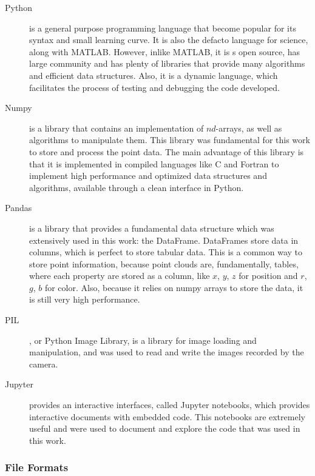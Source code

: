\begin{description}
    \item[Python] is a general purpose programming language that become popular for its syntax and small learning curve. It is also the defacto language for science, along with MATLAB. However, inlike MATLAB, it is s open source, has large community and has plenty of libraries that provide many algorithms and efficient data structures. Also, it is a dynamic language, which facilitates the process of testing and debugging the code developed.

    \item[Numpy] is a library that contains an implementation of $nd$-arrays, as well as algorithms to manipulate them. This library was fundamental for this work to store and process the point data. The main advantage of this library is that it is implemented in compiled languages like C and Fortran to implement high performance and optimized data structures and algorithms, available through a clean interface in Python.

    \item[Pandas] is a library that provides a fundamental data structure which was extensively used in this work: the DataFrame. DataFrames store data in columns, which is perfect to store tabular data. This is a common way to store point information, because point clouds are, fundamentally, tables, where each property are stored as a column, like $x$, $y$, $z$ for position and $r$, $g$, $b$ for color. Also, because it relies on numpy arrays to store the data, it is still very high performance.

    \item[PIL], or Python Image Library, is a library for image loading and manipulation, and was used to read and write the images recorded by the camera. 
    
    \item[Jupyter] provides an interactive interfaces, called Jupyter notebooks, which provides interactive documents with embedded code. This notebooks are extremely useful and were used to document and explore the code that was used in this work.

\end{description}

\subsubsection{File Formats}

